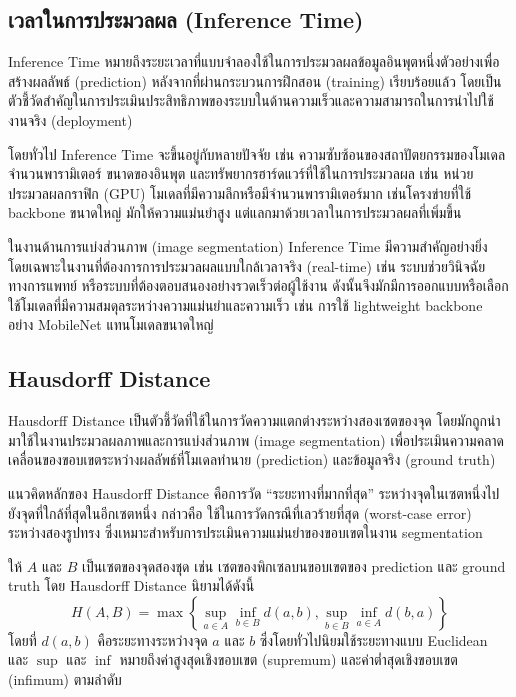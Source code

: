 \subsection{เวลาในการประมวลผล (Inference Time)}
Inference Time หมายถึงระยะเวลาที่แบบจำลองใช้ในการประมวลผลข้อมูลอินพุตหนึ่งตัวอย่างเพื่อสร้างผลลัพธ์ (prediction) หลังจากที่ผ่านกระบวนการฝึกสอน (training) เรียบร้อยแล้ว โดยเป็นตัวชี้วัดสำคัญในการประเมินประสิทธิภาพของระบบในด้านความเร็วและความสามารถในการนำไปใช้งานจริง (deployment) \cite{goodfellow2016deep}

โดยทั่วไป Inference Time จะขึ้นอยู่กับหลายปัจจัย เช่น ความซับซ้อนของสถาปัตยกรรมของโมเดล จำนวนพารามิเตอร์ ขนาดของอินพุต และทรัพยากรฮาร์ดแวร์ที่ใช้ในการประมวลผล เช่น หน่วยประมวลผลกราฟิก (GPU) \cite{han2016deep} โมเดลที่มีความลึกหรือมีจำนวนพารามิเตอร์มาก เช่นโครงข่ายที่ใช้ backbone ขนาดใหญ่ มักให้ความแม่นยำสูง แต่แลกมาด้วยเวลาในการประมวลผลที่เพิ่มขึ้น

ในงานด้านการแบ่งส่วนภาพ (image segmentation) Inference Time มีความสำคัญอย่างยิ่ง โดยเฉพาะในงานที่ต้องการการประมวลผลแบบใกล้เวลาจริง (real-time) เช่น ระบบช่วยวินิจฉัยทางการแพทย์ หรือระบบที่ต้องตอบสนองอย่างรวดเร็วต่อผู้ใช้งาน \cite{litjens2017survey} ดังนั้นจึงมักมีการออกแบบหรือเลือกใช้โมเดลที่มีความสมดุลระหว่างความแม่นยำและความเร็ว เช่น การใช้ lightweight backbone อย่าง MobileNet แทนโมเดลขนาดใหญ่


\subsection{Hausdorff Distance}
Hausdorff Distance เป็นตัวชี้วัดที่ใช้ในการวัดความแตกต่างระหว่างสองเซตของจุด โดยมักถูกนำมาใช้ในงานประมวลผลภาพและการแบ่งส่วนภาพ (image segmentation) เพื่อประเมินความคลาดเคลื่อนของขอบเขตระหว่างผลลัพธ์ที่โมเดลทำนาย (prediction) และข้อมูลจริง (ground truth) \cite{huttenlocher1993comparing}

แนวคิดหลักของ Hausdorff Distance คือการวัด “ระยะทางที่มากที่สุด” ระหว่างจุดในเซตหนึ่งไปยังจุดที่ใกล้ที่สุดในอีกเซตหนึ่ง กล่าวคือ ใช้ในการวัดกรณีที่เลวร้ายที่สุด (worst-case error) ระหว่างสองรูปทรง ซึ่งเหมาะสำหรับการประเมินความแม่นยำของขอบเขตในงาน segmentation

ให้ $A$ และ $B$ เป็นเซตของจุดสองชุด เช่น เซตของพิกเซลบนขอบเขตของ prediction และ ground truth โดย Hausdorff Distance นิยามได้ดังนี้
\begin{equation}
H(A, B) = \max\left\{\sup_{a \in A}\inf_{b \in B} d(a, b), \sup_{b \in B} \inf_{a \in A} d(b, a)\right\}
\end{equation}
โดยที่ $d(a, b)$ คือระยะทางระหว่างจุด $a$ และ $b$ ซึ่งโดยทั่วไปนิยมใช้ระยะทางแบบ Euclidean และ $\sup$ และ $\inf$ หมายถึงค่าสูงสุดเชิงขอบเขต (supremum) และค่าต่ำสุดเชิงขอบเขต (infimum) ตามลำดับ

